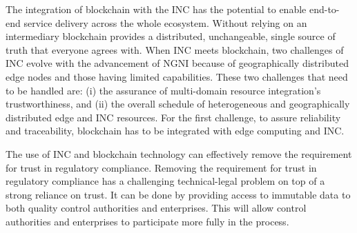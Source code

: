 The integration of blockchain with the INC has the potential to enable end-to-end service delivery across the whole ecosystem. Without relying on an intermediary blockchain provides a distributed, unchangeable, single source of truth that everyone agrees with. When INC meets blockchain, two challenges of INC evolve with the advancement of NGNI because of geographically distributed edge nodes and those having limited capabilities. These two challenges that need to be handled are: (i) the assurance of multi-domain resource integration's trustworthiness, and (ii) the overall schedule of heterogeneous and geographically distributed edge and INC resources. For the first challenge, to assure reliability and traceability, blockchain has to be integrated with edge computing and INC. 


The use of INC and blockchain technology can effectively remove the requirement for trust in regulatory compliance. Removing the requirement for trust in regulatory compliance has a challenging technical-legal problem on top of a strong reliance on trust. It can be done by providing access to immutable data to both quality control authorities and enterprises. This will allow control authorities and enterprises to participate more fully in the process. 


